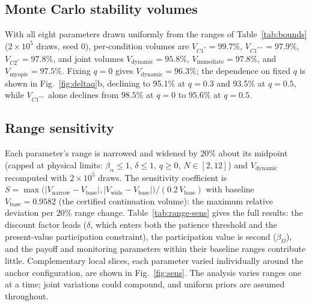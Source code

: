 \documentclass[manuscript,screen,review]{jair}
\newcommand{\VdynOverall}{95.8\%}      %
\newcommand{\Vmyopic}{97.5\%}          %
\newcommand{\Vimmediate}{97.8\%}       %
\newcommand{\VdynQzero}{96.3\%}        %
\newcommand{\VCOneDyn}{97.9\%}         %
\newcommand{\VCTwo}{97.8\%}            %
\newcommand{\VCOne}{99.7\%}            %
\newcommand{\VdynQhalf}{93.5\%}        %
\newcommand{\VdynQthree}{95.1\%}       %
\begin{document}
\subsection{Monte Carlo stability volumes}
With all eight parameters drawn uniformly from the ranges of Table~\ref{tab:bounds} ($2\times 10^5$ draws, seed 0), per-condition volumes are $V_{C1^*} = \VCOne{}$, $V_{C1^{**}} = \VCOneDyn{}$, $V_{C2^*} = \VCTwo{}$, and joint volumes $V_{\mathrm{dynamic}} = \VdynOverall{}$, $V_{\mathrm{immediate}} = \Vimmediate{}$, and $V_{\mathrm{myopic}} = \Vmyopic{}$. Fixing $q = 0$ gives $V_{\mathrm{dynamic}} = \VdynQzero{}$; the dependence on fixed $q$ is shown in Fig.~\ref{fig:deltaq}b, declining to \VdynQthree{} at $q=0.3$ and \VdynQhalf{} at $q = 0.5$, while $V_{C1^{**}}$ alone declines from $98.5\%$ at $q=0$ to $95.6\%$ at $q=0.5$.

\subsection{Range sensitivity}
Each parameter's range is narrowed and widened by $20\%$ about its midpoint (capped at physical limits: $\beta_\alpha \leq 1$, $\delta \leq 1$, $q \geq 0$, $N \in [2,12]$) and $V_{\mathrm{dynamic}}$ recomputed with $2\times 10^5$ draws. The sensitivity coefficient is $S = \max\bigl(|V_{\mathrm{narrow}} - V_{\mathrm{base}}|, |V_{\mathrm{wide}} - V_{\mathrm{base}}|\bigr) / (0.2\, V_{\mathrm{base}})$ with baseline $V_{\mathrm{base}} = 0.9582$ (the certified continuation volume): the maximum relative deviation per $20\%$ range change. Table~\ref{tab:range-sens} gives the full results: the discount factor leads ($\delta$, which enters both the patience threshold and the present-value participation constraint), the participation value is second ($\beta_\Omega$), and the payoff and monitoring parameters within their baseline ranges contribute little. Complementary local slices, each parameter varied individually around the anchor configuration, are shown in Fig.~\ref{fig:sens}. The analysis varies ranges one at a time; joint variations could compound, and uniform priors are assumed throughout.
\end{document}
